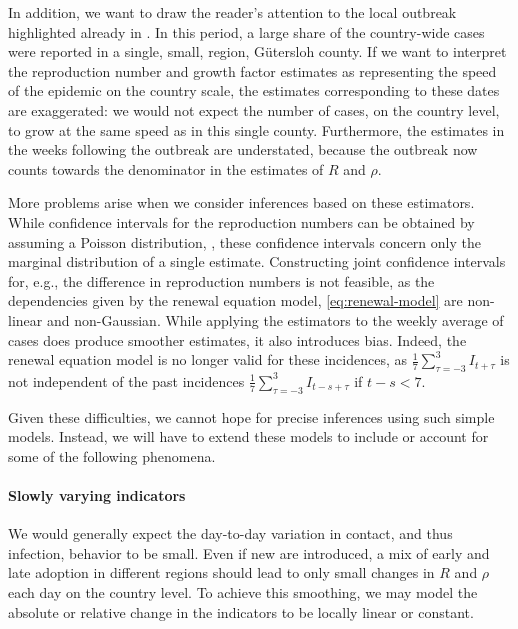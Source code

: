In addition, we want to draw the reader's attention to the local outbreak highlighted already in . In this period, a large share of the country-wide cases were reported in a single, small, region, Gütersloh county. If we want to interpret the reproduction number and growth factor estimates as representing the speed of the epidemic on the country scale, the estimates corresponding to these dates are exaggerated: we would not expect the number of cases, on the country level, to grow at the same speed as in this single county. Furthermore, the estimates in the weeks following the outbreak are understated, because the outbreak now counts towards the denominator in the estimates of $R$ and $\rho$. 

More problems arise when we consider inferences based on these estimators. While confidence intervals for the reproduction numbers can be obtained by assuming a Poisson distribution, , these confidence intervals concern only the marginal distribution of a single estimate. Constructing joint confidence intervals for, e.g., the difference in reproduction numbers is not feasible, as the dependencies given by the renewal equation model, \eqref{eq:renewal-model} are non-linear and non-Gaussian. While applying the estimators to the weekly average of cases does produce smoother estimates, it also introduces bias. Indeed, the renewal equation model is no longer valid for these incidences, as $\frac{1}{7}\sum_{\tau = -3}^3 I_{t + \tau}$ is not independent of the past incidences $\frac{1}7 \sum_{\tau = -3 }^3 I_{t - s +\tau}$ if $t - s < 7$. 



Given these difficulties, we cannot hope for precise inferences using such simple models. Instead, we will have to extend these models to include or account for some of the following phenomena.

\paragraph{Slowly varying indicators}
We would generally expect the day-to-day variation in contact, and thus infection, behavior to be small. Even if new  are introduced, a mix of early and late adoption in different regions should lead to only small changes in $R$ and $\rho$ each day on the country level. 
To achieve this smoothing, we may model the absolute or relative change in the indicators to be locally linear or constant. 

